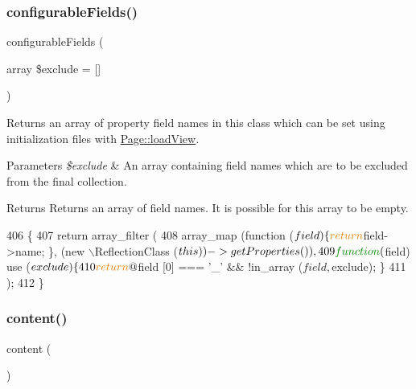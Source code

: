 \subsubsection{\texorpdfstring{configurable\+Fields()}{configurableFields()}}
{\footnotesize\ttfamily configurable\+Fields (\begin{DoxyParamCaption}\item[{array}]{\$exclude = {\ttfamily \mbox{[}\mbox{]}} }\end{DoxyParamCaption})\hspace{0.3cm}{\ttfamily [private]}}

Returns an array of property field names in this class which can be set using initialization files with \hyperlink{class_lora_1_1_page_a943f0df56a6f8dbc260ddb31925ce4f6}{Page\+::load\+View}. 
\begin{DoxyParams}{Parameters}
{\em \$exclude} & An array containing field names which are to be excluded from the final collection. \\
\hline
\end{DoxyParams}
\begin{DoxyReturn}{Returns}
Returns an array of field names. It is possible for this array to be empty. 
\end{DoxyReturn}

\begin{DoxyCode}
406                                                               \{
407         \textcolor{keywordflow}{return} array\_filter (
408             array\_map (\textcolor{keyword}{function} ($field) \{ \textcolor{keywordflow}{return} $field->name; \}, (new \(\backslash\)ReflectionClass ($this))->
      getProperties ()),
409             \textcolor{keyword}{function} ($field) use ($exclude) \{
410                 \textcolor{keywordflow}{return} @$field [0] === \textcolor{charliteral}{'\_'} && !in\_array ($field, $exclude); \}
411         );
412     \}
\end{DoxyCode}
\mbox{\label{class_lora_1_1_page_a9b80bb36f89498eac4f43bf08461240d}} 
\subsubsection{\texorpdfstring{content()}{content()}}
{\footnotesize\ttfamily content (\begin{DoxyParamCaption}{ }\end{DoxyParamCaption})}

